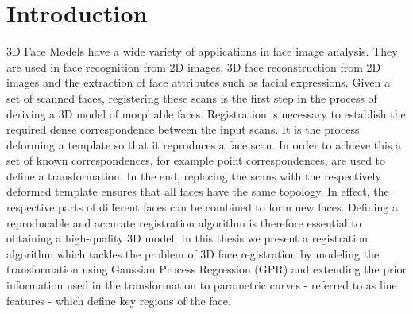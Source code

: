 \chapter{Introduction}
3D Face Models have a wide variety of applications in face image analysis. They are used in face recognition from 2D images, 3D face reconstruction from 2D images and the extraction of face attributes such as facial expressions. Given a set of scanned faces, registering these scans is the first step in the process of deriving a 3D model of morphable faces. Registration is necessary to establish the required dense correspondence between the input scans. It is the process deforming a template
so that it reproduces a face scan. In order to achieve this a set of known correspondences, for example point correspondences, are used to define a transformation. In the end, replacing the scans with the respectively deformed template ensures that all faces have the same topology. In effect, the respective parts of different faces can be combined to form new faces. Defining a reproducable and accurate registration algorithm is therefore essential to obtaining a high-quality 3D model. 
In this thesis we present a registration algorithm which tackles the problem of 3D face registration by modeling the transformation using Gaussian Process Regression (GPR) and extending the prior information used in the transformation to parametric curves - referred to as line features - which define key regions of the face.

